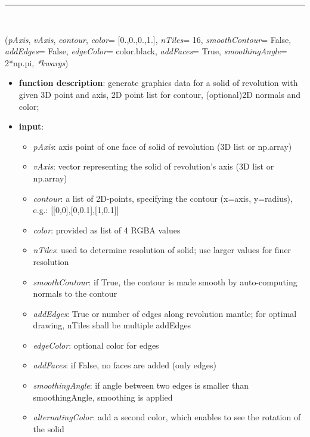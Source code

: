 \begin{itemize}[leftmargin=1.4cm]
\begin{itemize}[leftmargin=1.4cm]
\begin{itemize}[leftmargin=1.4cm]
\begin{itemize}[leftmargin=0.5cm]
\begin{itemize}[leftmargin=1.4cm]
\begin{itemize}[leftmargin=1.4cm]
\begin{itemize}[leftmargin=1.4cm]
\begin{itemize}[leftmargin=0.5cm]
\begin{itemize}[leftmargin=1.4cm]
%
\noindent\rule{8cm}{0.75pt}\vspace{1pt} \\ 
\begin{flushleft}
\label{sec:graphics:SolidOfRevolution}
({\it pAxis}, {\it vAxis}, {\it contour}, {\it color}= [0.,0.,0.,1.], {\it nTiles}= 16, {\it smoothContour}= False, {\it addEdges}= False, {\it edgeColor}= color.black, {\it addFaces}= True, {\it smoothingAngle}= 2*np.pi, {\it **kwargs})
\end{flushleft}
\setlength{\itemindent}{0.7cm}
\begin{itemize}[leftmargin=0.7cm]
\item[--]
{\bf function description}: generate graphics data for a solid of revolution with given 3D point and axis, 2D point list for contour, (optional)2D normals and color;
\item[--]
{\bf input}: \vspace{-6pt}
\begin{itemize}[leftmargin=1.2cm]
\setlength{\itemindent}{-0.7cm}
\item[]{\it pAxis}: axis point of one face of solid of revolution (3D list or np.array)
\item[]{\it vAxis}: vector representing the solid of revolution's axis (3D list or np.array)
\item[]{\it contour}: a list of 2D-points, specifying the contour (x=axis, y=radius), e.g.: [[0,0],[0,0.1],[1,0.1]]
\item[]{\it color}: provided as list of 4 RGBA values
\item[]{\it nTiles}: used to determine resolution of solid; use larger values for finer resolution
\item[]{\it smoothContour}: if True, the contour is made smooth by auto-computing normals to the contour
\item[]{\it addEdges}: True or number of edges along revolution mantle; for optimal drawing, nTiles shall be multiple addEdges
\item[]{\it edgeColor}: optional color for edges
\item[]{\it addFaces}: if False, no faces are added (only edges)
\item[]{\it smoothingAngle}: if angle between two edges is smaller than smoothingAngle, smoothing is applied
\item[]{\it alternatingColor}: add a second color, which enables to see the rotation of the solid

\end{itemize}
\end{itemize}
\end{itemize}
\end{itemize}
\end{itemize}
\end{itemize}
\end{itemize}
\end{itemize}
\end{itemize}
\end{itemize}
\end{itemize}
